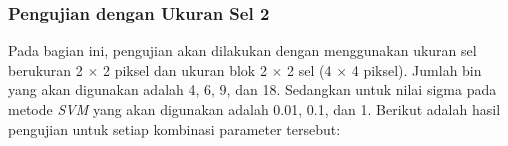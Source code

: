 \subsubsection{Pengujian dengan Ukuran Sel 2}
\noindent Pada bagian ini, pengujian akan dilakukan dengan menggunakan ukuran sel berukuran 2 $\times$ 2 piksel dan ukuran blok 2 $\times$ 2 sel (4 $\times$ 4 piksel). Jumlah bin yang akan digunakan adalah 4, 6, 9, dan 18. Sedangkan untuk nilai sigma pada metode \textit{SVM} yang akan digunakan adalah 0.01, 0.1, dan 1. Berikut adalah hasil pengujian untuk setiap kombinasi parameter tersebut:
